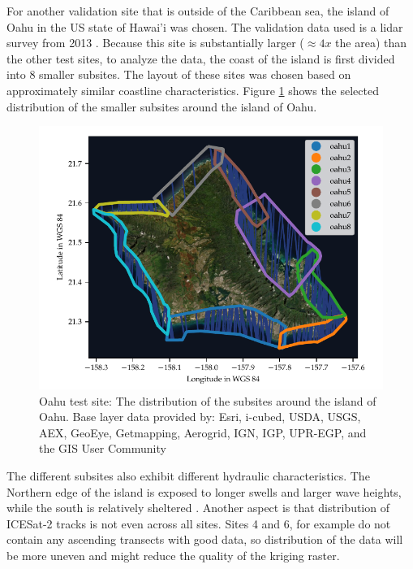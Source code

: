 For another validation site that is outside of the Caribbean sea, the island of Oahu in the US state of Hawai'i was chosen. The validation data used is a lidar survey from 2013
. Because this site is substantially larger ($\approx 4x$ the area) than the other test sites, to analyze the data, the coast of the island is first divided into 8 smaller subsites. The layout of these sites was chosen based on approximately similar coastline characteristics. Figure \ref{fig:oahu-subsite-layout} shows the selected distribution of the smaller subsites around the island of Oahu.

\begin{figure}[htbp]
    \centering
    \includegraphics{figures/Oahu_all_tracklines.pdf}
    \caption{Oahu test site: The distribution of the subsites around the island of Oahu. Base layer data provided by: Esri, i-cubed, USDA, USGS, AEX, GeoEye, Getmapping, Aerogrid, IGN, IGP, UPR-EGP, and the GIS User Community}
    \label{fig:oahu-subsite-layout}
\end{figure}

The different subsites also exhibit different hydraulic characteristics. The Northern edge of the island is exposed to longer swells and larger wave heights, while the south is relatively sheltered \parencite{Vitousek2008a}. Another aspect is that distribution of ICESat-2 tracks is not even across all sites. Sites 4 and 6, for example do not contain any ascending  transects with good data, so distribution of the data will be more uneven and might reduce the quality of the kriging raster.

